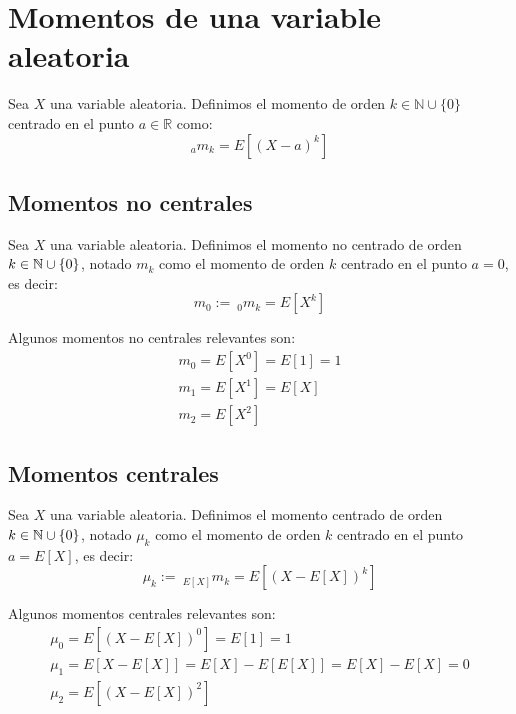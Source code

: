 \section{Momentos de una variable aleatoria}

Sea $X$ una variable aleatoria. Definimos el momento de orden $k\in \mathbb{N}\cup \{0\}$ centrado en el punto $a\in \mathbb{R}$ como:
\begin{equation*}
    _a m_k = E[(X-a)^k]
\end{equation*}

\subsection{Momentos no centrales}

\begin{definicion}
    Sea $X$ una variable aleatoria. Definimos el momento no centrado de orden $k \in \mathbb N \cup \{0\}$, notado $m_k$ como el momento de orden $k$ centrado en el punto $a=0$, es decir:
    \begin{equation*}
        m_0:=~{_0 m_k} = E[X^k]
    \end{equation*}
\end{definicion}

Algunos momentos no centrales relevantes son:
$$\begin{array}{l}
    m_0 = E[X^0] = E[1] = 1 \\
    m_1 = E[X^1] = E[X]     \\
    m_2 = E[X^2]
\end{array}$$

\subsection{Momentos centrales}

\begin{definicion}
    Sea $X$ una variable aleatoria. Definimos el momento centrado de orden $k \in \mathbb N \cup \{0\}$, notado $\mu_k$ como el momento de orden $k$ centrado en el punto $a=E[X]$, es decir:
    $$\mu_k :=~{_{E[X]} m_k}=  E[(X - E[X])^k]$$
\end{definicion}

Algunos momentos centrales relevantes son:
$$\begin{array}{l}
    \mu_0 = E[(X-E[X])^0] = E[1] = 1                     \\
    \mu_1 = E[X-E[X]] = E[X] - E[E[X]] = E[X] - E[X] = 0 \\
    \mu_2 = E[(X-E[X])^2]
  \end{array}$$

